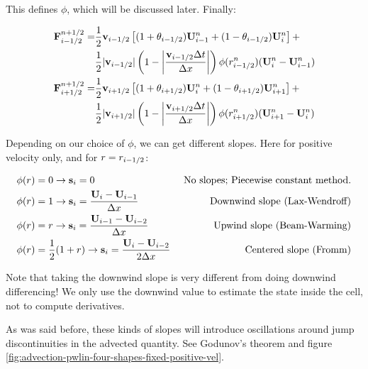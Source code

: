 This defines $\phi$, which will be discussed later. Finally:

\begin{align}
	\mathbf{F}_{i-1/2}^{n+1/2} = 
		&\frac{1}{2} \mathbf{v}_{i-1/2} \left[  (1 + \theta_{i-1/2}) \mathbf{U}_{i-1}^n + (1 - \theta_{i-1/2})  \mathbf{U}_{i}^n \right] +\nonumber\\
		&\frac{1}{2}| \mathbf{v}_{i-1/2} | \left( 1 - \left| \frac{\mathbf{v}_{i-1/2} \Delta t}{\Delta x} \right| \right) \phi(r_{i-1/2}^n) (\mathbf{U}_i^n - \mathbf{U}_{i-1}^n ) \label{eq:advection_phi1-limiters}\\
	\mathbf{F}_{i+1/2}^{n+1/2} = 
		&\frac{1}{2} \mathbf{v}_{i+1/2} \left[  (1 + \theta_{i+1/2}) \mathbf{U}_{i}^n + (1 - \theta_{i+1/2})  \mathbf{U}_{i+1}^n \right] +\nonumber\\
		&\frac{1}{2}| \mathbf{v}_{i+1/2} | \left( 1 - \left| \frac{\mathbf{v}_{i+1/2} \Delta t}{\Delta x} \right| \right) \phi(r_{i+1/2}^n) (\mathbf{U}_{i+1}^n - \mathbf{U}_{i}^n ) \label{eq:advection_phi2-limiters}
\end{align}







Depending on our choice of $\phi$, we can get different slopes. Here for positive velocity only, and for $r = r_{i-1/2}$:

\begin{align*}
	\phi(r) & = 0 \rightarrow \mathbf{s}_i = 0 
		&\text{ No slopes; Piecewise constant method.}\\
	\phi(r) & = 1 \rightarrow \mathbf{s}_i = \frac{\mathbf{U}_{i} - \mathbf{U}_{i-1}}{\Delta x} 
		&\text{ Downwind slope (Lax-Wendroff)} \\
	\phi(r) & = r \rightarrow \mathbf{s}_i = \frac{\mathbf{U}_{i-1} - \mathbf{U}_{i-2}}{\Delta x} 
		&\text{Upwind slope (Beam-Warming)} \\
	\phi(r) & = \frac{1}{2} (1 + r) \rightarrow \mathbf{s}_i = \frac{\mathbf{U}_{i} - \mathbf{U}_{i-2}}{2 \Delta x} 
		&\text{ Centered slope (Fromm)} \\
\end{align*}



Note that taking the downwind slope is very different from doing downwind differencing!
We only use the downwind value to estimate the state inside the cell, not to compute derivatives.



As was said before, these kinds of slopes will introduce oscillations around jump discontinuities in the advected quantity.
See Godunov's theorem and figure \ref{fig:advection-pwlin-four-shapes-fixed-positive-vel}.



